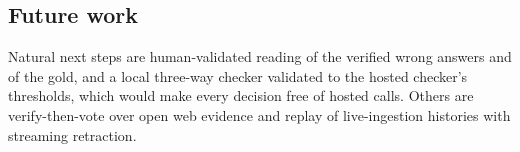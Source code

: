 \subsection{Future work}
\label{sec:future}

Natural next steps are human-validated reading of the verified wrong answers and of the gold, and a local three-way checker validated to the hosted checker's thresholds, which would make every decision free of hosted calls. Others are verify-then-vote over open web evidence and replay of live-ingestion histories with streaming retraction.

